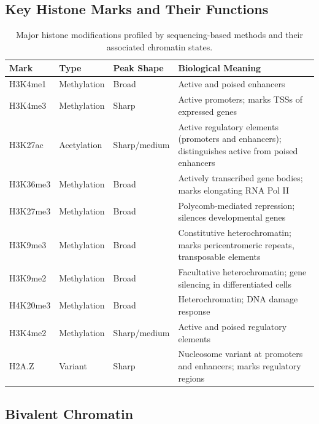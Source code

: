 \subsection{Key Histone Marks and Their Functions}
\label{subsec:histones:key-marks}

\begin{table}[htbp]
\centering
\caption[Key histone modifications and their biological meanings.]{Major histone modifications profiled by sequencing-based methods and their associated chromatin states.}
\label{tab:histones:marks}
\small
\begin{tabularx}{\textwidth}{l l l X}
\toprule
\textbf{Mark} & \textbf{Type} & \textbf{Peak Shape} & \textbf{Biological Meaning} \\
\midrule
H3K4me1 & Methylation & Broad & Active and poised enhancers \\
\addlinespace
H3K4me3 & Methylation & Sharp & Active promoters; marks TSSs of expressed genes \\
\addlinespace
H3K27ac & Acetylation & Sharp/medium & Active regulatory elements (promoters and enhancers); distinguishes active from poised enhancers \\
\addlinespace
H3K36me3 & Methylation & Broad & Actively transcribed gene bodies; marks elongating RNA Pol II \\
\addlinespace
H3K27me3 & Methylation & Broad & Polycomb-mediated repression; silences developmental genes \\
\addlinespace
H3K9me3 & Methylation & Broad & Constitutive heterochromatin; marks pericentromeric repeats, transposable elements \\
\addlinespace
H3K9me2 & Methylation & Broad & Facultative heterochromatin; gene silencing in differentiated cells \\
\addlinespace
H4K20me3 & Methylation & Broad & Heterochromatin; DNA damage response \\
\addlinespace
H3K4me2 & Methylation & Sharp/medium & Active and poised regulatory elements \\
\addlinespace
H2A.Z & Variant & Sharp & Nucleosome variant at promoters and enhancers; marks regulatory regions \\
\bottomrule
\end{tabularx}
\end{table}

\subsection{Bivalent Chromatin}
\label{subsec:histones:bivalent}

